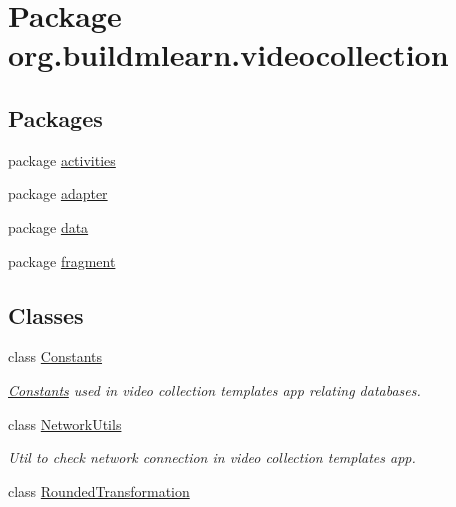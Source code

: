\hypertarget{namespaceorg_1_1buildmlearn_1_1videocollection}{}\section{Package org.\+buildmlearn.\+videocollection}
\label{namespaceorg_1_1buildmlearn_1_1videocollection}
\subsection*{Packages}
\begin{DoxyCompactItemize}
\item 
package \hyperlink{namespaceorg_1_1buildmlearn_1_1videocollection_1_1activities}{activities}
\item 
package \hyperlink{namespaceorg_1_1buildmlearn_1_1videocollection_1_1adapter}{adapter}
\item 
package \hyperlink{namespaceorg_1_1buildmlearn_1_1videocollection_1_1data}{data}
\item 
package \hyperlink{namespaceorg_1_1buildmlearn_1_1videocollection_1_1fragment}{fragment}
\end{DoxyCompactItemize}
\subsection*{Classes}
\begin{DoxyCompactItemize}
\item 
class \hyperlink{classorg_1_1buildmlearn_1_1videocollection_1_1Constants}{Constants}
\begin{DoxyCompactList}\small\item\em \hyperlink{classorg_1_1buildmlearn_1_1videocollection_1_1Constants}{Constants} used in video collection template\textquotesingle{}s app relating databases. \end{DoxyCompactList}\item 
class \hyperlink{classorg_1_1buildmlearn_1_1videocollection_1_1NetworkUtils}{Network\+Utils}
\begin{DoxyCompactList}\small\item\em Util to check network connection in video collection template\textquotesingle{}s app. \end{DoxyCompactList}\item 
class \hyperlink{classorg_1_1buildmlearn_1_1videocollection_1_1RoundedTransformation}{Rounded\+Transformation}
\end{DoxyCompactItemize}
